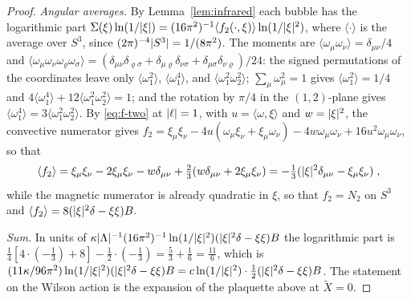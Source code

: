 \documentclass[11pt]{preprint}
\DeclarePairedDelimiter{\abs}{\lvert}{\rvert}
\numberwithin{equation}{section}
\theoremstyle{definition}
\theoremstyle{remark}
\theoremstyle{plain}
\begin{document}
\begin{proof}
\emph{Angular averages.} By Lemma~\ref{lem:infrared} each bubble has the logarithmic part $\Sigma(\xi)\ln(1/\abs{\xi}) = (16\pi^2)^{-1}\langle f_2(\cdot, \xi)\rangle\ln(1/\abs{\xi}^2)$, where $\langle\cdot\rangle$ is the average over $S^3$, since $(2\pi)^{-4}\abs{S^3} = 1/(8\pi^2)$. The moments are $\langle\omega_\mu\omega_\nu\rangle = \delta_{\mu\nu}/4$ and $\langle\omega_\mu\omega_\nu\omega_\varrho\omega_\sigma\rangle = (\delta_{\mu\nu}\delta_{\varrho\sigma} + \delta_{\mu\varrho}\delta_{\nu\sigma} + \delta_{\mu\sigma}\delta_{\nu\varrho})/24$: the signed permutations of the coordinates leave only $\langle\omega_1^2\rangle$, $\langle\omega_1^4\rangle$, and $\langle\omega_1^2\omega_2^2\rangle$; $\sum_\mu\omega_\mu^2 = 1$ gives $\langle\omega_1^2\rangle = 1/4$ and $4\langle\omega_1^4\rangle + 12\langle\omega_1^2\omega_2^2\rangle = 1$; and the rotation by $\pi/4$ in the $(1, 2)$-plane gives $\langle\omega_1^4\rangle = 3\langle\omega_1^2\omega_2^2\rangle$. By \eqref{eq:f-two} at $\abs{\ell} = 1$, with $u = \langle\omega, \xi\rangle$ and $w = \abs{\xi}^2$, the convective numerator gives $f_2 = \xi_\mu\xi_\nu - 4u(\omega_\mu\xi_\nu + \xi_\mu\omega_\nu) - 4w\omega_\mu\omega_\nu + 16u^2\omega_\mu\omega_\nu$, so that
\begin{equation}\label{eq:convective-average}
    \langle f_2\rangle = \xi_\mu\xi_\nu - 2\xi_\mu\xi_\nu - w\delta_{\mu\nu} + \tfrac23(w\delta_{\mu\nu} + 2\xi_\mu\xi_\nu) = -\tfrac13(\abs{\xi}^2\delta_{\mu\nu} - \xi_\mu\xi_\nu)\;,
\end{equation}
while the magnetic numerator is already quadratic in $\xi$, so that $f_2 = N_2$ on $S^3$ and $\langle f_2\rangle = 8(\abs{\xi}^2\delta - \xi\xi)B$.

\emph{Sum.} In units of $\kappa\abs{\Lambda}^{-1}(16\pi^2)^{-1}\ln(1/\abs{\xi}^2)(\abs{\xi}^2\delta - \xi\xi)B$ the logarithmic part is $\frac14[4\cdot(-\frac13) + 8] - \frac12\cdot(-\frac13) = \frac53 + \frac16 = \frac{11}{6}$, which is $(11\kappa/96\pi^2)\ln(1/\abs{\xi}^2)(\abs{\xi}^2\delta - \xi\xi)B = c\ln(1/\abs{\xi}^2)\cdot\frac12(\abs{\xi}^2\delta - \xi\xi)B$. The statement on the Wilson action is the expansion of the plaquette above at $\tilde X = 0$.
\end{proof}
\end{document}
